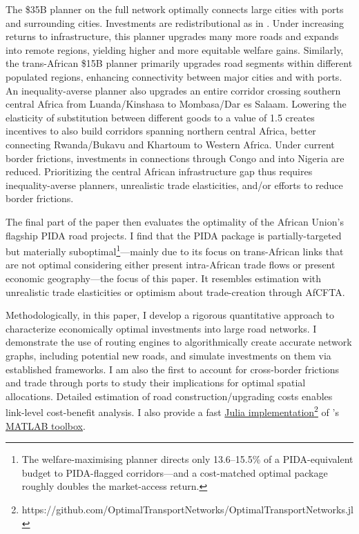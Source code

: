 \documentclass[a4paper]{article}
\begin{document}
The \$35B planner on the full network optimally connects large cities with ports and surrounding cities. Investments are redistributional as in \citet{gorton2022trade}. Under increasing returns to infrastructure, this planner upgrades many more roads and expands into remote regions, yielding higher and more equitable welfare gains. Similarly, the trans-African \$15B planner primarily upgrades road segments within different populated regions, enhancing connectivity between major cities and with ports. An inequality-averse planner also upgrades an entire corridor crossing southern central Africa from Luanda/Kinshasa to Mombasa/Dar es Salaam. Lowering the elasticity of substitution between different goods to a value of 1.5 creates incentives to also build corridors spanning northern central Africa, better connecting Rwanda/Bukavu and Khartoum to Western Africa. Under current border frictions, investments in connections through Congo and into Nigeria are reduced. Prioritizing the central African infrastructure gap thus requires inequality-averse planners, unrealistic trade elasticities, and/or efforts to reduce border frictions. \newline 

The final part of the paper then evaluates the optimality of the African Union's flagship PIDA road projects. I find that the PIDA package is partially-targeted but materially suboptimal\footnote{The welfare-maximising planner directs only 13.6--15.5\% of a PIDA-equivalent budget to PIDA-flagged corridors---and a cost-matched optimal package roughly doubles the market-access return.}---mainly due to its focus on trans-African links that are not optimal considering either present intra-African trade flows or present economic geography---the focus of this paper. It resembles estimation with unrealistic trade elasticities or optimism about trade-creation through AfCFTA.%

Methodologically, in this paper, I develop a rigorous quantitative approach to characterize economically optimal investments into large road networks. I demonstrate the use of routing engines to algorithmically create accurate network graphs, including potential new roads, and simulate investments on them via established frameworks. I am also the first to account for cross-border frictions and trade through ports to study their implications for optimal spatial allocations. Detailed estimation of road construction/upgrading costs enables link-level cost-benefit analysis. I also provide a fast \href{https://github.com/OptimalTransportNetworks/OptimalTransportNetworks.jl}{Julia implementation}\footnote{https://github.com/OptimalTransportNetworks/OptimalTransportNetworks.jl} of \citet{fajgelbaum2020optimal}'s \href{https://github.com/OptimalTransportNetworks/OptimalTransportNetworkToolbox}{MATLAB toolbox}.
\end{document}

